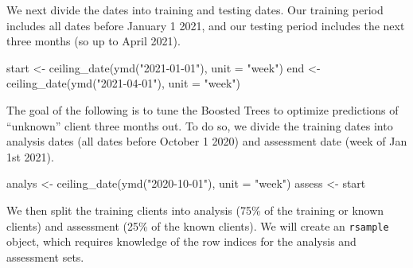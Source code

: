\documentclass[
]{article}
\newenvironment{Shaded}{\begin{snugshade}}{\end{snugshade}}
\newcommand{\AttributeTok}[1]{\textcolor[rgb]{0.77,0.63,0.00}{#1}}
\newcommand{\FunctionTok}[1]{\textcolor[rgb]{0.00,0.00,0.00}{#1}}
\newcommand{\NormalTok}[1]{#1}
\newcommand{\OtherTok}[1]{\textcolor[rgb]{0.56,0.35,0.01}{#1}}
\newcommand{\StringTok}[1]{\textcolor[rgb]{0.31,0.60,0.02}{#1}}
\begin{document}
We next divide the dates into training and testing dates. Our training
period includes all dates before January 1 2021, and our testing period
includes the next three months (so up to April 2021).

\begin{Shaded}
\begin{Highlighting}[]
\NormalTok{start }\OtherTok{\textless{}{-}} \FunctionTok{ceiling\_date}\NormalTok{(}\FunctionTok{ymd}\NormalTok{(}\StringTok{"2021{-}01{-}01"}\NormalTok{), }\AttributeTok{unit =} \StringTok{"week"}\NormalTok{)}
\NormalTok{end }\OtherTok{\textless{}{-}} \FunctionTok{ceiling\_date}\NormalTok{(}\FunctionTok{ymd}\NormalTok{(}\StringTok{"2021{-}04{-}01"}\NormalTok{), }\AttributeTok{unit =} \StringTok{"week"}\NormalTok{)}
\end{Highlighting}
\end{Shaded}

The goal of the following is to tune the Boosted Trees to optimize
predictions of ``unknown'' client three months out. To do so, we divide
the training dates into analysis dates (all dates before October 1 2020)
and assessment date (week of Jan 1st 2021).

\begin{Shaded}
\begin{Highlighting}[]
\NormalTok{analys }\OtherTok{\textless{}{-}} \FunctionTok{ceiling\_date}\NormalTok{(}\FunctionTok{ymd}\NormalTok{(}\StringTok{"2020{-}10{-}01"}\NormalTok{), }\AttributeTok{unit =} \StringTok{"week"}\NormalTok{)}
\NormalTok{assess }\OtherTok{\textless{}{-}}\NormalTok{ start}
\end{Highlighting}
\end{Shaded}

We then split the training clients into analysis (75\% of the training
or known clients) and assessment (25\% of the known clients). We will
create an \texttt{rsample} object, which requires knowledge of the row
indices for the analysis and assessment sets.
\end{document}
